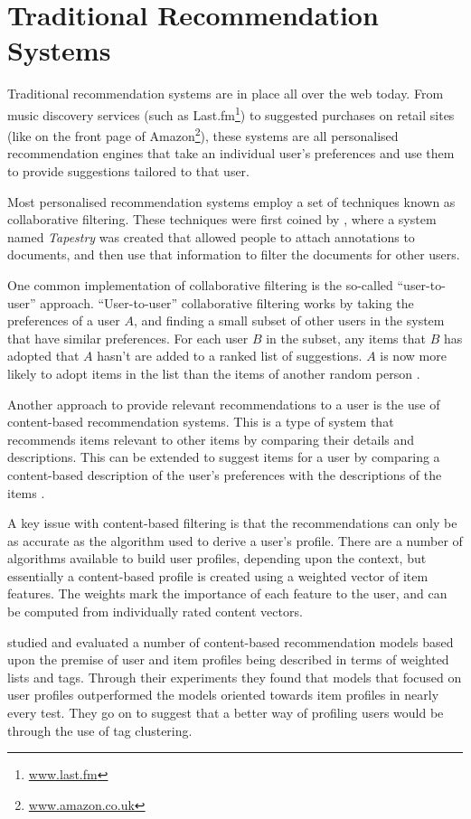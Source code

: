 \documentclass[11pt,a4paper]{report}
\begin{document}
\section{Traditional Recommendation Systems}
Traditional recommendation systems are in place all over the web today. From music discovery services (such as Last.fm\footnote{\url{www.last.fm}}) to suggested purchases on retail sites (like on the front page of Amazon\footnote{\url{www.amazon.co.uk}}), these systems are all personalised recommendation engines that take an individual user's preferences and use them to provide suggestions tailored to that user.

Most personalised recommendation systems employ a set of techniques known as collaborative filtering. These techniques were first coined by \textcite{Goldberg:1992}, where a system named \emph{Tapestry} was created that allowed people to attach annotations to documents, and then use that information to filter the documents for other users.

One common implementation of collaborative filtering is the so-called ``user-to-user'' approach. ``User-to-user'' collaborative filtering works by taking the preferences of a user $A$, and finding a small subset of other users in the system that have similar preferences. For each user $B$ in the subset, any items that $B$ has adopted that $A$ hasn't are added to a ranked list of suggestions. $A$ is now more likely to adopt items in the list than the items of another random person \parencite{Schafer:2001}.

Another approach to provide relevant recommendations to a user is the use of content-based recommendation systems. This is a type of system that recommends items relevant to other items by comparing their details and descriptions. This can be extended to suggest items for a user by comparing a content-based description of the user's preferences with the descriptions of the items \parencite{Pazzani:2007}.

A key issue with content-based filtering is that the recommendations can only be as accurate as the algorithm used to derive a user's profile. There are a number of algorithms available to build user profiles, depending upon the context, but essentially a content-based profile is created using a weighted vector of item features. The weights mark the importance of each feature to the user, and can be computed from individually rated content vectors.

\textcite{Cantador:2010} studied and evaluated a number of content-based recommendation models based upon the premise of user and item profiles being described in terms of weighted lists and tags. Through their experiments they found that models that focused on user profiles outperformed the models oriented towards item profiles in nearly every test. They go on to suggest that a better way of profiling users would be through the use of tag clustering.
\end{document}

